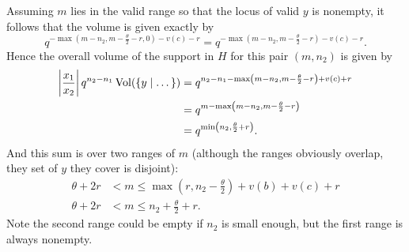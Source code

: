 Assuming $m$ lies in the valid range so that the locus of valid $y$ is nonempty,
it follows that the volume is given exactly by
\[ q^{-\max(m-n_2, m - \frac{\theta}{2} - r, 0) - v(c) - r}
  = q^{-\max(m-n_2, m - \frac{\theta}{2} - r) - v(c) - r}. \]
Hence the overall volume of the support in $H$ for this pair $(m, n_2)$ is given by
\begin{align*}
  \left\lvert \frac{x_1}{x_2} \right\rvert q^{n_2 - n_1} \operatorname{Vol}(\{ y \mid \dots \})
  &= q^{n_2 - n_1 - \max\left( m-n_2, m - \frac{\theta}{2} - r \right) + v(c) + r} \\
  &= q^{m - \max\left( m-n_2, m - \frac{\theta}{2} - r \right)} \\
  &= q^{\min\left( n_2, \frac{\theta}{2} + r \right)}.
\end{align*}
And this sum is over two ranges of $m$
(although the ranges obviously overlap, they set of $y$ they cover is disjoint):
\begin{align*}
  \theta + 2r & < m \le \max\left( r, n_2 - \frac{\theta}{2} \right) + v(b) + v(c) + r \\
  \theta + 2r & < m \le n_2 + \frac{\theta}{2} + r.
\end{align*}
Note the second range could be empty if $n_2$ is small enough,
but the first range is always nonempty.
